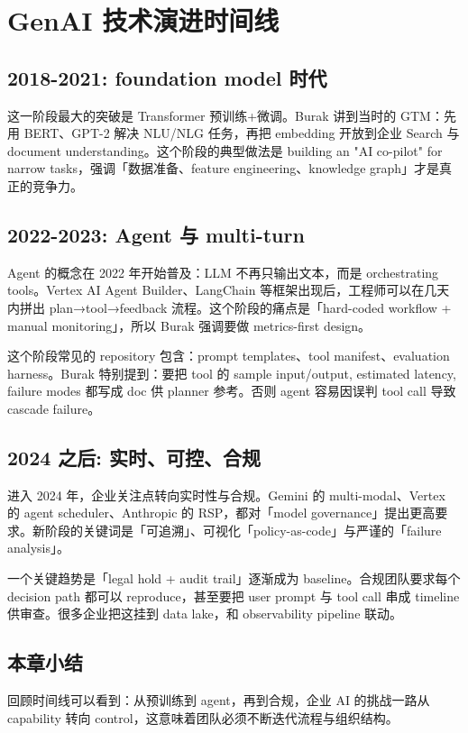 \section{GenAI 技术演进时间线}

\subsection{2018-2021: foundation model 时代}

这一阶段最大的突破是 Transformer 预训练+微调。Burak 讲到当时的 GTM：先用 BERT、GPT-2 解决 NLU/NLG 任务，再把 embedding 开放到企业 Search 与 document understanding。这个阶段的典型做法是 building an "AI co-pilot" for narrow tasks，强调「数据准备、feature engineering、knowledge graph」才是真正的竞争力。

\subsection{2022-2023: Agent 与 multi-turn}
Agent 的概念在 2022 年开始普及：LLM 不再只输出文本，而是 orchestrating tools。Vertex AI Agent Builder、LangChain 等框架出现后，工程师可以在几天内拼出 plan→tool→feedback 流程。这个阶段的痛点是「hard-coded workflow + manual monitoring」，所以 Burak 强调要做 metrics-first design。

这个阶段常见的 repository 包含：prompt templates、tool manifest、evaluation harness。Burak 特别提到：要把 tool 的 sample input/output, estimated latency, failure modes 都写成 doc 供 planner 参考。否则 agent 容易因误判 tool call 导致 cascade failure。

\subsection{2024 之后: 实时、可控、合规}

进入 2024 年，企业关注点转向实时性与合规。Gemini 的 multi-modal、Vertex 的 agent scheduler、Anthropic 的 RSP，都对「model governance」提出更高要求。新阶段的关键词是「可追溯」、可视化「policy-as-code」与严谨的「failure analysis」。

一个关键趋势是「legal hold + audit trail」逐渐成为 baseline。合规团队要求每个 decision path 都可以 reproduce，甚至要把 user prompt 与 tool call 串成 timeline 供审查。很多企业把这挂到 data lake，和 observability pipeline 联动。

\subsection{本章小结}

回顾时间线可以看到：从预训练到 agent，再到合规，企业 AI 的挑战一路从 capability 转向 control，这意味着团队必须不断迭代流程与组织结构。

